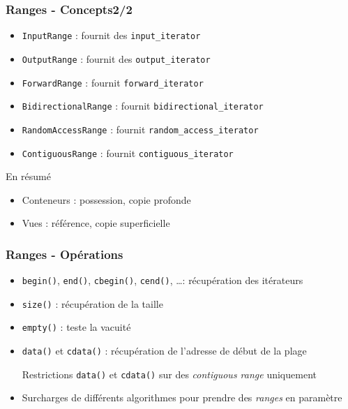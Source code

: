 \documentclass[C++.tex]{subfiles}
\begin{document}
\begin{frame}[fragile]
	\frametitle{Ranges - Concepts\titlehfill{}2/2}
	\begin{itemize}
		\item \lstinline|InputRange| : fournit des \lstinline|input_iterator|
		\item \lstinline|OutputRange| : fournit des \lstinline|output_iterator|
		\item \lstinline|ForwardRange| : fournit \lstinline|forward_iterator|
		\item \lstinline|BidirectionalRange| : fournit \lstinline|bidirectional_iterator|
		\item \lstinline|RandomAccessRange| : fournit \lstinline|random_access_iterator|
		\item \lstinline|ContiguousRange| : fournit \lstinline|contiguous_iterator|
	\end{itemize}

	\begin{block}{En résumé}
		\begin{itemize}
			\item Conteneurs : possession, copie profonde
			\item Vues : référence, copie superficielle
		\end{itemize}
	\end{block}

\end{frame}

\begin{frame}
	\frametitle{Ranges - Opérations}
	\begin{itemize}
		\item \lstinline|begin()|, \lstinline|end()|, \lstinline|cbegin()|, \lstinline|cend()|, \ldots : récupération des itérateurs


		\item \lstinline|size()| : récupération de la taille
		\item \lstinline|empty()| : teste la vacuité
		\item \lstinline|data()| et \lstinline|cdata()| : récupération de l'adresse de début de la plage

		\begin{alertblock}{Restrictions}
			\lstinline|data()| et \lstinline|cdata()| sur des \textit{contiguous range} uniquement
		\end{alertblock}

		\item Surcharges de différents algorithmes pour prendre des \textit{ranges} en paramètre
	\end{itemize}
\end{frame}
\end{document}
